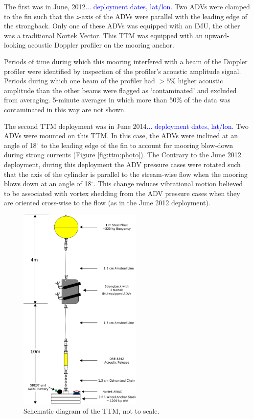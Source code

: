 \documentclass[twocol]{ametsoc}
\newcommand{\note}[1]{\textcolor{blue}{#1}}
\begin{document}
The first was in June, 2012\note{... deployment dates, lat/lon.} Two ADVs were clamped to the fin such that the $z$-axis of the ADVs were parallel with the leading edge of the strongback. Only one of these ADVs was equipped with an IMU, the other was a traditional Nortek Vector. This TTM was equipped with an upward-looking acoustic Doppler profiler on the mooring anchor.

Periods of time during which this mooring interfered with a beam of the Doppler profiler were identified by inspection of the profiler's acoustic amplitude signal. Periods during which one beam of the profiler had $>5\%$ higher acoustic amplitude than the other beams were flagged as `contaminated' and excluded from averaging.  5-minute averages in which more than 50\% of the data was contaminated in this way are not shown.

The second TTM deployment was in June 2014\note{... deployment dates, lat/lon.} Two ADVs were mounted on this TTM. In this case, the ADVs were inclined at an angle of 18$^\circ$ to the leading edge of the fin to account for mooring blow-down during strong currents (Figure \ref{fig:ttm:photo}). The Contrary to the June 2012 deployment, during this deployment the ADV pressure cases were rotated such that the axis of the cylinder is parallel to the stream-wise flow when the mooring blows down at an angle of 18$^\circ$. This change reduces vibrational motion believed to be associated with vortex shedding from the ADV pressure cases when they are oriented cross-wise to the flow (as in the June 2012 deployment).

\begin{figure}[t]
  \centering
  \includegraphics[width=2.4in]{ttm04b}
  \caption{Schematic diagram of the TTM, not to scale.}
  \label{fig:ttm:diagram}
\end{figure}
\end{document}
